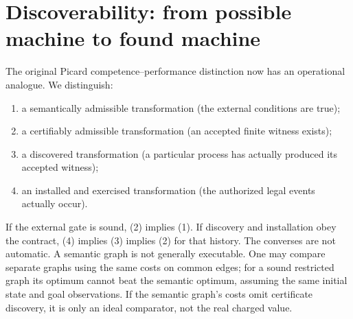 \documentclass[11pt]{article}
\theoremstyle{remark}\newtheorem{remark}[theorem]{Remark}
\begin{document}
\section{Discoverability: from possible machine to found machine}
The original Picard competence--performance distinction now has an operational analogue. We distinguish:
\begin{enumerate}
\item a semantically admissible transformation (the external conditions are true);
\item a certifiably admissible transformation (an accepted finite witness exists);
\item a discovered transformation (a particular process has actually produced its accepted witness);
\item an installed and exercised transformation (the authorized legal events actually occur).
\end{enumerate}
If the external gate is sound, (2) implies (1). If discovery and installation obey the contract, (4) implies (3) implies (2) for that history. The converses are not automatic. A semantic graph is not generally executable. One may compare separate graphs using the same costs on common edges; for a sound restricted graph its optimum cannot beat the semantic optimum, assuming the same initial state and goal observations. If the semantic graph's costs omit certificate discovery, it is only an ideal comparator, not the real charged value.
\end{document}

